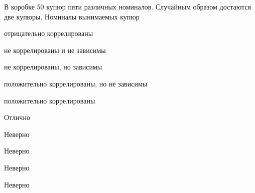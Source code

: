 
\begin{question}
В коробке 50 купюр пяти различных номиналов. Случайным образом достаются
две купюры. Номиналы вынимаемых купюр
\begin{answerlist}
  \item отрицательно коррелированы
  \item не коррелированы и не зависимы
  \item не коррелированы, но зависимы
  \item положительно коррелированы, но не зависимы
  \item положительно коррелированы
\end{answerlist}
\end{question}

\begin{solution}
\begin{answerlist}
  \item Отлично
  \item Неверно
  \item Неверно
  \item Неверно
  \item Неверно
\end{answerlist}
\end{solution}

